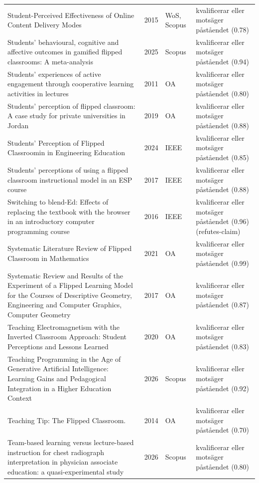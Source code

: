 \begin{longtable}{@{}%
  >{\raggedright\arraybackslash}p{}c%
  >{\raggedright\arraybackslash}p{}%
  >{\raggedright\arraybackslash}p{}@{}}
Student-Perceived Effectiveness of Online Content Delivery Modes & 2015 & WoS, Scopus & kvalificerar eller motsäger påståendet (0.78) \\
Students' behavioural, cognitive and affective outcomes in gamified flipped classrooms: A meta-analysis & 2025 & Scopus & kvalificerar eller motsäger påståendet (0.94) \\
Students' experiences of active engagement through cooperative learning activities in lectures & 2011 & OA & kvalificerar eller motsäger påståendet (0.80) \\
Students' perception of flipped classroom: A case study for private universities in Jordan & 2019 & OA & kvalificerar eller motsäger påståendet (0.88) \\
Students' Perception of Flipped Classroomin in Engineering Education & 2024 & IEEE & kvalificerar eller motsäger påståendet (0.85) \\
Students' perceptions of using a flipped classroom instructional model in an ESP course & 2017 & IEEE & kvalificerar eller motsäger påståendet (0.88) \\
Switching to blend-Ed: Effects of replacing the textbook with the browser in an introductory computer programming course & 2016 & IEEE & kvalificerar eller motsäger påståendet (0.96) (refutes-claim) \\
Systematic Literature Review of Flipped Classroom in Mathematics & 2021 & OA & kvalificerar eller motsäger påståendet (0.99) \\
Systematic Review and Results of the Experiment of a Flipped Learning Model for the Courses of Descriptive Geometry, Engineering and Computer Graphics, Computer Geometry & 2017 & OA & kvalificerar eller motsäger påståendet (0.87) \\
Teaching Electromagnetism with the Inverted Classroom Approach: Student Perceptions and Lessons Learned & 2020 & OA & kvalificerar eller motsäger påståendet (0.83) \\
Teaching Programming in the Age of Generative Artificial Intelligence: Learning Gains and Pedagogical Integration in a Higher Education Context & 2026 & Scopus & kvalificerar eller motsäger påståendet (0.92) \\
Teaching Tip: The Flipped Classroom. & 2014 & OA & kvalificerar eller motsäger påståendet (0.70) \\
Team-based learning versus lecture-based instruction for chest radiograph interpretation in physician associate education: a quasi-experimental study & 2026 & Scopus & kvalificerar eller motsäger påståendet (0.80) \\

\end{longtable}
